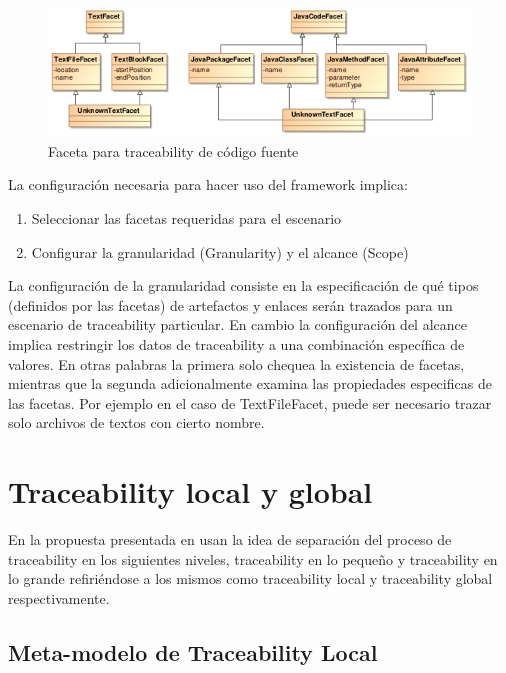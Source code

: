 \documentclass[a4paper,12pt,oneside,spanish]{book}
\begin{document}
\begin{figure}[hbtp]
\centering
\includegraphics[scale=.72]{./img/Faceta}
\caption{Faceta para traceability de código fuente}
\label{fig:FacetaCodigoFuente}
\end{figure}

La configuración necesaria para hacer uso del framework implica:

\begin{enumerate}
\item Seleccionar las facetas requeridas para el escenario
\item Configurar la granularidad (Granularity) y el alcance (Scope)
\end{enumerate}

La configuración de la granularidad consiste en la especificación de qué tipos (definidos por las facetas) de artefactos y enlaces serán trazados para un escenario de traceability particular. En cambio la configuración del alcance implica restringir los datos de traceability a una combinación específica de valores. En otras palabras la primera solo chequea la existencia de facetas, mientras que la segunda adicionalmente examina las propiedades especificas de las facetas. Por ejemplo en el caso de TextFileFacet, puede ser necesario trazar solo archivos de textos con cierto nombre.

\section{Traceability local y global}

En la propuesta presentada en \cite{GlitiaEtienDumoulin} usan la idea de separación del proceso de traceability en los siguientes niveles, traceability en lo pequeño y traceability en lo grande refiriéndose a los mismos como traceability local y traceability global respectivamente.

\subsection{Meta-modelo de Traceability Local}
\end{document}
